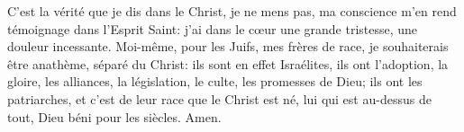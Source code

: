 C'est la vérité que je dis dans le Christ,
	je ne mens pas, ma conscience m'en rend témoignage dans l'Esprit Saint:
	j’ai dans le cœur une grande tristesse, une douleur incessante.
Moi-même, pour les Juifs, mes frères de race,
	je souhaiterais être anathème, séparé du Christ:
	ils sont en effet Israélites, ils ont l’adoption,
	la gloire, les alliances, la législation, le culte, les promesses de Dieu;
	ils ont les patriarches,
	et c’est de leur race que le Christ est né, lui qui est au-dessus de tout,
	Dieu béni pour les siècles. Amen.
